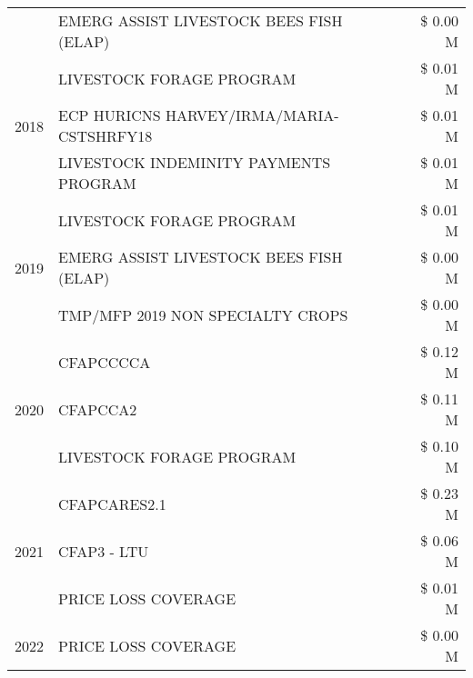 \begin{tabular}{llr}
 & EMERG ASSIST LIVESTOCK BEES FISH (ELAP) & \$ 0.00 M \\
\cline{1-3}
\multirow[t]{3}{*}{2018} & LIVESTOCK FORAGE PROGRAM & \$ 0.01 M \\
 & ECP HURICNS HARVEY/IRMA/MARIA-CSTSHRFY18 & \$ 0.01 M \\
 & LIVESTOCK INDEMINITY PAYMENTS PROGRAM & \$ 0.01 M \\
\cline{1-3}
\multirow[t]{3}{*}{2019} & LIVESTOCK FORAGE PROGRAM & \$ 0.01 M \\
 & EMERG ASSIST LIVESTOCK BEES FISH (ELAP) & \$ 0.00 M \\
 & TMP/MFP 2019 NON SPECIALTY CROPS & \$ 0.00 M \\
\cline{1-3}
\multirow[t]{3}{*}{2020} & CFAPCCCCA & \$ 0.12 M \\
 & CFAPCCA2 & \$ 0.11 M \\
 & LIVESTOCK FORAGE PROGRAM & \$ 0.10 M \\
\cline{1-3}
\multirow[t]{3}{*}{2021} & CFAPCARES2.1 & \$ 0.23 M \\
 & CFAP3 - LTU & \$ 0.06 M \\
 & PRICE LOSS COVERAGE & \$ 0.01 M \\
\cline{1-3}
2022 & PRICE LOSS COVERAGE & \$ 0.00 M \\
\cline{1-3}
\bottomrule
\end{tabular}
